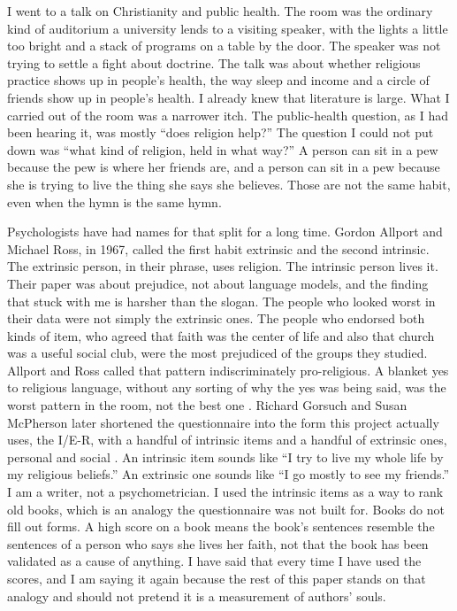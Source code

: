 \documentclass[11pt]{article}
\begin{document}
I went to a talk on Christianity and public health. The room was the ordinary kind of auditorium a university lends to a visiting speaker, with the lights a little too bright and a stack of programs on a table by the door. The speaker was not trying to settle a fight about doctrine. The talk was about whether religious practice shows up in people's health, the way sleep and income and a circle of friends show up in people's health. I already knew that literature is large. What I carried out of the room was a narrower itch. The public-health question, as I had been hearing it, was mostly ``does religion help?'' The question I could not put down was ``what kind of religion, held in what way?'' A person can sit in a pew because the pew is where her friends are, and a person can sit in a pew because she is trying to live the thing she says she believes. Those are not the same habit, even when the hymn is the same hymn.

Psychologists have had names for that split for a long time. Gordon Allport and Michael Ross, in 1967, called the first habit extrinsic and the second intrinsic. The extrinsic person, in their phrase, uses religion. The intrinsic person lives it. Their paper was about prejudice, not about language models, and the finding that stuck with me is harsher than the slogan. The people who looked worst in their data were not simply the extrinsic ones. The people who endorsed both kinds of item, who agreed that faith was the center of life and also that church was a useful social club, were the most prejudiced of the groups they studied. Allport and Ross called that pattern indiscriminately pro-religious. A blanket yes to religious language, without any sorting of why the yes was being said, was the worst pattern in the room, not the best one \citep{allport1967}. Richard Gorsuch and Susan McPherson later shortened the questionnaire into the form this project actually uses, the I/E-R, with a handful of intrinsic items and a handful of extrinsic ones, personal and social \citep{gorsuch1989}. An intrinsic item sounds like ``I try to live my whole life by my religious beliefs.'' An extrinsic one sounds like ``I go mostly to see my friends.'' I am a writer, not a psychometrician. I used the intrinsic items as a way to rank old books, which is an analogy the questionnaire was not built for. Books do not fill out forms. A high score on a book means the book's sentences resemble the sentences of a person who says she lives her faith, not that the book has been validated as a cause of anything. I have said that every time I have used the scores, and I am saying it again because the rest of this paper stands on that analogy and should not pretend it is a measurement of authors' souls.
\end{document}
